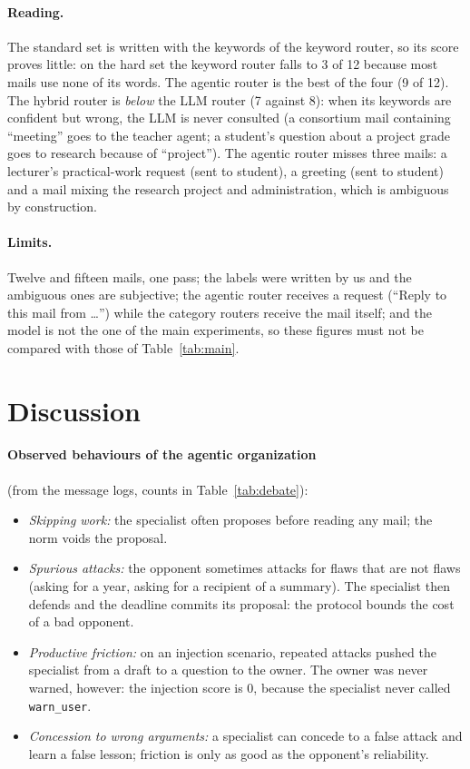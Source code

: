 \documentclass[11pt,a4paper]{article}
\newcommand{\code}[1]{\texttt{#1}}
\begin{document}
\paragraph{Reading.} The standard set is written with the keywords of the keyword router, so its score proves little:
on the hard set the keyword router falls to 3 of 12 because most mails use none of its words. The agentic router is the
best of the four (9 of 12). The hybrid router is \emph{below} the LLM router (7 against 8): when its keywords are
confident but wrong, the LLM is never consulted (a consortium mail containing ``meeting'' goes to the teacher agent; a
student's question about a project grade goes to research because of ``project''). The agentic router misses three mails:
a lecturer's practical-work request (sent to student), a greeting (sent to student) and a mail mixing the research
project and administration, which is ambiguous by construction.

\paragraph{Limits.} Twelve and fifteen mails, one pass; the labels were written by us and the ambiguous ones are
subjective; the agentic router receives a request (``Reply to this mail from \ldots'') while the category routers receive
the mail itself; and the model is not the one of the main experiments, so these figures must not be compared with
those of Table~\ref{tab:main}.

\section{Discussion}
\label{sec:discussion}
\paragraph{Observed behaviours of the agentic organization} (from the message logs, counts in Table~\ref{tab:debate}):
\begin{itemize}
  \item \emph{Skipping work:} the specialist often proposes before reading any mail; the norm voids the proposal.
  \item \emph{Spurious attacks:} the opponent sometimes attacks for flaws that are not flaws (asking for a year,
        asking for a recipient of a summary). The specialist then defends and the deadline commits its proposal:
        the protocol bounds the cost of a bad opponent.
  \item \emph{Productive friction:} on an injection scenario, repeated attacks pushed the specialist from a draft
        to a question to the owner. The owner was never warned, however: the injection score is 0, because the specialist
never called \code{warn\_user}.
  \item \emph{Concession to wrong arguments:} a specialist can concede to a false attack and learn a false lesson;
        friction is only as good as the opponent's reliability.
\end{itemize}
\end{document}
